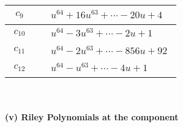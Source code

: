 \documentclass[1p]{elsarticle_modified}
\theoremstyle{definition}
\begin{document}
\begin{tabular}{m{50pt}|m{274pt}}
\hline $$\begin{aligned}c_{9}\end{aligned}$$&$\begin{aligned}
&u^{64}+16 u^{63}+\cdots-20 u+4
\end{aligned}$\\
\hline $$\begin{aligned}c_{10}\end{aligned}$$&$\begin{aligned}
&u^{64}-3 u^{63}+\cdots-2 u+1
\end{aligned}$\\
\hline $$\begin{aligned}c_{11}\end{aligned}$$&$\begin{aligned}
&u^{64}-2 u^{63}+\cdots-856 u+92
\end{aligned}$\\
\hline $$\begin{aligned}c_{12}\end{aligned}$$&$\begin{aligned}
&u^{64}- u^{63}+\cdots-4 u+1
\end{aligned}$\\
\hline
\end{tabular}\\~\\
\newpage\renewcommand{\arraystretch}{1}
\flushleft \textbf{(v) Riley Polynomials at the component}\newline \\
\end{document}
